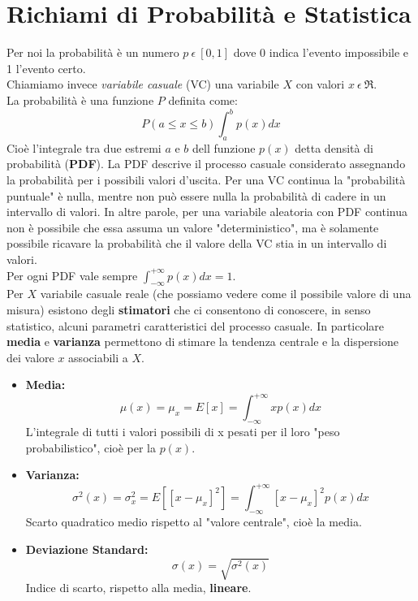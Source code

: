 \documentclass[a4paper,11pt]{report}
\begin{document}
\section{Richiami di Probabilità e Statistica}
Per noi la probabilità è un numero $p\ \epsilon\ [0,1]$ dove 0 indica l'evento impossibile e 1 l'evento certo.\\
Chiamiamo invece \textit{variabile casuale} (VC) una variabile $X$ con valori $x\ \epsilon\ \Re $.\\
La probabilità è una funzione $P$ definita come:
$$P(a \le x \le b) \int^b_a p(x)dx$$
Cioè l'integrale tra due estremi $a$ e $b$ dell funzione $p(x)$ detta densità di probabilità (\textbf{PDF}). La PDF descrive il processo casuale considerato assegnando la probabilità per i possibili valori d'uscita. Per una VC continua la "probabilità puntuale" è nulla, mentre non può essere nulla la probabilità di cadere in un intervallo di valori. In altre parole, per una variabile aleatoria con PDF continua non è possibile che essa assuma un valore "deterministico", ma è solamente possibile ricavare la probabilità che il valore della VC stia in un intervallo di valori.\\
Per ogni PDF vale sempre $\int^{+\infty}_{-\infty}p(x)dx = 1$.\\

Per $X$ variabile casuale reale (che possiamo vedere come il possibile valore di una misura) esistono degli \textbf{stimatori} che ci consentono di conoscere, in senso statistico, alcuni parametri caratteristici del processo casuale. In particolare \textbf{media} e \textbf{varianza} permettono di stimare la tendenza centrale e la dispersione dei valore $x$ associabili a $X$.
\begin{itemize}
  \item \textbf{Media:}
  $$ \mu(x) = \mu_{x} = E[x] = \int^{+\infty}_{-\infty}xp(x)dx$$
    L'integrale di tutti i valori possibili di x pesati per il loro "peso probabilistico", cioè per la $p(x)$.
  \item \textbf{Varianza:}
  $$ \sigma^{2}(x) = \sigma^{2}_{x} = E[[x - \mu_{x}]^{2}] = \int^{+\infty}_{-\infty}[x - \mu_{x}]^{2}p(x)dx$$
  Scarto quadratico medio rispetto al "valore centrale", cioè la media.
  \item \textbf{Deviazione Standard:}
  $$ \sigma(x) = \sqrt{\sigma^{2}(x)} $$
  Indice di scarto, rispetto alla media, \textbf{lineare}.
\end{itemize}
\end{document}

